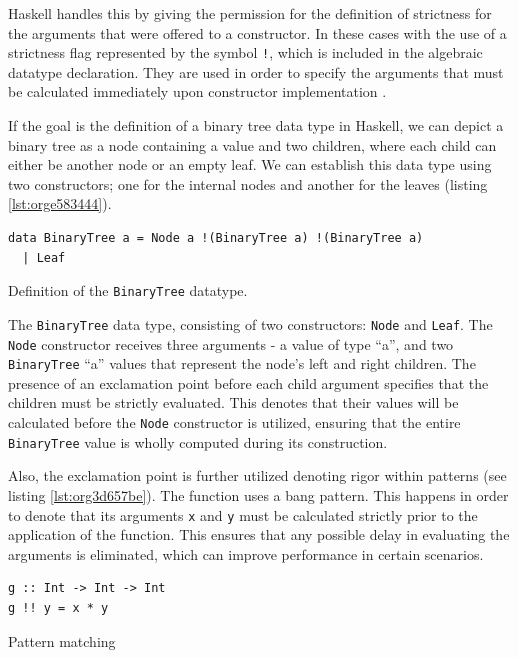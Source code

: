 \documentclass[a4paper, titlepage, twoside]{article}
\begin{document}
Haskell handles this by giving the permission for the definition of strictness for the arguments that were offered to a constructor. In these cases with the use of a strictness flag represented by the symbol \texttt{!}, which is included in the algebraic datatype declaration. They are used in order to specify the arguments that must be calculated immediately upon constructor implementation \autocite{marlowHaskell2010Language2010,haskellwikiHaskellHaskellWiki2023}.

If the goal is the definition of a binary tree data type in Haskell, we can depict a binary tree as a node containing a value and two children, where each child can either be another node or an empty leaf. We can establish this data type using two constructors; one for the internal nodes and another for the leaves (listing \ref{lst:orge583444}).

\begin{listing}[htbp]
\begin{verbatim}
data BinaryTree a = Node a !(BinaryTree a) !(BinaryTree a)
  | Leaf
\end{verbatim}
\caption{\label{lst:orge583444}Definition of the \texttt{BinaryTree} datatype.}
\end{listing}

The \texttt{BinaryTree} data type, consisting of two constructors: \texttt{Node} and \texttt{Leaf}. The \texttt{Node} constructor receives three arguments - a value of type ``a'', and two \texttt{BinaryTree} ``a'' values that represent the node's left and right children. The presence of an exclamation point before each child argument specifies that the children must be strictly evaluated. This denotes that their values will be calculated before the \texttt{Node} constructor is utilized, ensuring that the entire \texttt{BinaryTree} value is wholly computed during its construction.

Also, the exclamation point is further utilized denoting rigor within patterns (see listing \ref{lst:org3d657be}). The function uses a bang pattern. This happens in order to denote that its arguments \texttt{x} and \texttt{y} must be calculated strictly prior to the application of the function. This ensures that any possible delay in evaluating the arguments is eliminated, which can improve performance in certain scenarios.

\begin{listing}[htbp]
\begin{verbatim}
g :: Int -> Int -> Int
g !! y = x * y
\end{verbatim}
\caption{\label{lst:org3d657be}Pattern matching}
\end{listing}
\end{document}
